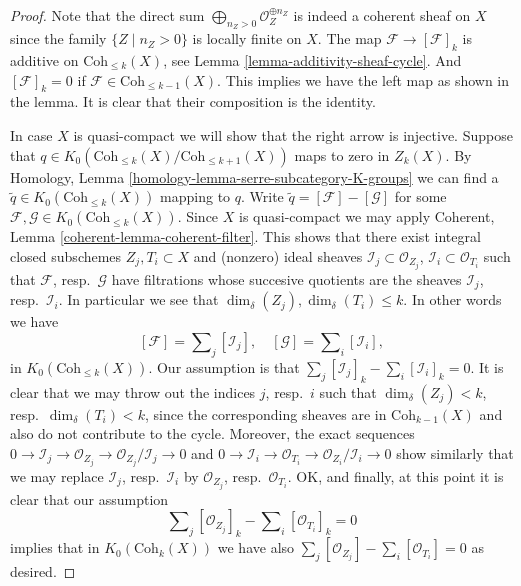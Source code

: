 \begin{proof}
Note that the direct sum
$\bigoplus\nolimits_{n_Z > 0} \mathcal{O}_Z^{\oplus n_Z}$
is indeed a coherent sheaf on $X$ since the family $\{Z \mid n_Z > 0\}$
is locally finite on $X$.
The map $\mathcal{F} \to [\mathcal{F}]_k$ is additive
on $\text{Coh}_{\leq k}(X)$, see
Lemma \ref{lemma-additivity-sheaf-cycle}. And $[\mathcal{F}]_k = 0$
if $\mathcal{F} \in \text{Coh}_{\leq k - 1}(X)$.
This implies we have the left map as shown in the lemma.
It is clear that their composition is the identity.

\medskip\noindent
In case $X$ is quasi-compact we will show that the right arrow
is injective.
Suppose that $q \in K_0(\text{Coh}_{\leq k}(X)/\text{Coh}_{\leq k + 1}(X))$
maps to zero in $Z_k(X)$. By
Homology, Lemma \ref{homology-lemma-serre-subcategory-K-groups}
we can find
a $\tilde q \in K_0(\text{Coh}_{\leq k}(X))$ mapping to $q$.
Write $\tilde q = [\mathcal{F}] - [\mathcal{G}]$ for some
$\mathcal{F}, \mathcal{G} \in K_0(\text{Coh}_{\leq k}(X))$.
Since $X$ is quasi-compact we may apply
Coherent, Lemma \ref{coherent-lemma-coherent-filter}.
This shows that there exist integral closed subschemes
$Z_j, T_i \subset X$ and (nonzero) ideal sheaves
$\mathcal{I}_j \subset \mathcal{O}_{Z_j}$,
$\mathcal{I}_i \subset \mathcal{O}_{T_i}$ such that
$\mathcal{F}$, resp.\ $\mathcal{G}$ have filtrations whose succesive
quotients are the sheaves $\mathcal{I}_j$, resp.\ $\mathcal{I}_i$.
In particular we see that $\dim_\delta(Z_j), \dim_\delta(T_i) \leq k$.
In other words we have
$$
[\mathcal{F}] = \sum\nolimits_j [\mathcal{I}_j],
\quad
[\mathcal{G}] = \sum\nolimits_i [\mathcal{I}_i],
$$
in $K_0(\text{Coh}_{\leq k}(X))$. Our assumption is that
$\sum_j [\mathcal{I}_j]_k - \sum_i [\mathcal{I}_i]_k = 0$.
It is clear that we may throw out the indices $j$, resp.\ $i$
such that $\dim_\delta(Z_j) < k$, resp.\ $\dim_\delta(T_i) < k$,
since the corresponding sheaves are in $\text{Coh}_{k - 1}(X)$ and
also do not contribute to the cycle. Moreover, the exact sequences
$0 \to \mathcal{I}_j \to \mathcal{O}_{Z_j} \to
\mathcal{O}_{Z_j}/\mathcal{I}_j \to 0$
and
$0 \to \mathcal{I}_i \to \mathcal{O}_{T_i} \to
\mathcal{O}_{Z_i}/\mathcal{I}_i \to 0$
show similarly that we may replace $\mathcal{I}_j$, resp.\ $\mathcal{I}_i$
by $\mathcal{O}_{Z_j}$, resp.\ $\mathcal{O}_{T_i}$.
OK, and finally, at this point it is clear that our assumption
$$
\sum\nolimits_j [\mathcal{O}_{Z_j}]_k - \sum\nolimits_i [\mathcal{O}_{T_i}]_k
= 0
$$
implies that in $K_0(\text{Coh}_k(X))$ we have also
$\sum\nolimits_j [\mathcal{O}_{Z_j}] - \sum\nolimits_i [\mathcal{O}_{T_i}]
= 0$
as desired.
\end{proof}

